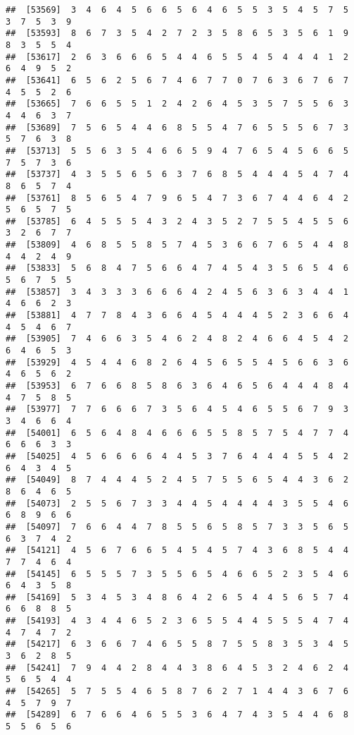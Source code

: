 \documentclass[
]{book}
\begin{document}
\begin{verbatim}
##  [53569]  3  4  6  4  5  6  6  5  6  4  6  5  5  3  5  4  5  7  5  3  7  5  3  9
##  [53593]  8  6  7  3  5  4  2  7  2  3  5  8  6  5  3  5  6  1  9  8  3  5  5  4
##  [53617]  2  6  3  6  6  6  5  4  4  6  5  5  4  5  4  4  4  1  2  6  4  9  5  2
##  [53641]  6  5  6  2  5  6  7  4  6  7  7  0  7  6  3  6  7  6  7  4  5  5  2  6
##  [53665]  7  6  6  5  5  1  2  4  2  6  4  5  3  5  7  5  5  6  3  4  4  6  3  7
##  [53689]  7  5  6  5  4  4  6  8  5  5  4  7  6  5  5  5  6  7  3  5  7  6  3  8
##  [53713]  5  5  6  3  5  4  6  6  5  9  4  7  6  5  4  5  6  6  5  7  5  7  3  6
##  [53737]  4  3  5  5  6  5  6  3  7  6  8  5  4  4  4  5  4  7  4  8  6  5  7  4
##  [53761]  8  5  6  5  4  7  9  6  5  4  7  3  6  7  4  4  6  4  2  5  6  5  7  5
##  [53785]  6  4  5  5  5  4  3  2  4  3  5  2  7  5  5  4  5  5  6  3  2  6  7  7
##  [53809]  4  6  8  5  5  8  5  7  4  5  3  6  6  7  6  5  4  4  8  4  4  2  4  9
##  [53833]  5  6  8  4  7  5  6  6  4  7  4  5  4  3  5  6  5  4  6  5  6  7  5  5
##  [53857]  3  4  3  3  3  6  6  6  4  2  4  5  6  3  6  3  4  4  1  4  6  6  2  3
##  [53881]  4  7  7  8  4  3  6  6  4  5  4  4  4  5  2  3  6  6  4  4  5  4  6  7
##  [53905]  7  4  6  6  3  5  4  6  2  4  8  2  4  6  6  4  5  4  2  6  4  6  5  3
##  [53929]  4  5  4  4  6  8  2  6  4  5  6  5  5  4  5  6  6  3  6  4  6  5  6  2
##  [53953]  6  7  6  6  8  5  8  6  3  6  4  6  5  6  4  4  4  8  4  4  7  5  8  5
##  [53977]  7  7  6  6  6  7  3  5  6  4  5  4  6  5  5  6  7  9  3  3  4  6  6  4
##  [54001]  6  5  6  4  8  4  6  6  6  5  5  8  5  7  5  4  7  7  4  6  6  6  3  3
##  [54025]  4  5  6  6  6  6  4  4  5  3  7  6  4  4  4  5  5  4  2  6  4  3  4  5
##  [54049]  8  7  4  4  4  5  2  4  5  7  5  5  6  5  4  4  3  6  2  8  6  4  6  5
##  [54073]  2  5  5  6  7  3  3  4  4  5  4  4  4  4  3  5  5  4  6  6  8  9  6  6
##  [54097]  7  6  6  4  4  7  8  5  5  6  5  8  5  7  3  3  5  6  5  6  3  7  4  2
##  [54121]  4  5  6  7  6  6  5  4  5  4  5  7  4  3  6  8  5  4  4  7  7  4  6  4
##  [54145]  6  5  5  5  7  3  5  5  6  5  4  6  6  5  2  3  5  4  6  6  4  3  5  8
##  [54169]  5  3  4  5  3  4  8  6  4  2  6  5  4  4  5  6  5  7  4  6  6  8  8  5
##  [54193]  4  3  4  4  6  5  2  3  6  5  5  4  4  5  5  5  4  7  4  4  7  4  7  2
##  [54217]  6  3  6  6  7  4  6  5  5  8  7  5  5  8  3  5  3  4  5  3  6  2  8  5
##  [54241]  7  9  4  4  2  8  4  4  3  8  6  4  5  3  2  4  6  2  4  5  6  5  4  4
##  [54265]  5  7  5  5  4  6  5  8  7  6  2  7  1  4  4  3  6  7  6  4  5  7  9  7
##  [54289]  6  7  6  6  4  6  5  5  3  6  4  7  4  3  5  4  4  6  8  5  5  6  5  6

\end{verbatim}
\end{document}

